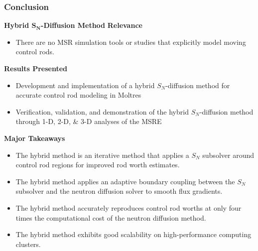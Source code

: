 \begin{frame}
  \frametitle{Conclusion}
  \begin{block}{\textbf{Hybrid $\bm{S_N}$-Diffusion Method}}
    \textbf{Relevance}
    \begin{itemize}
      \item There are no MSR simulation tools or studies that explicitly model moving control rods.
    \end{itemize}
    \textbf{Results Presented}
    \begin{itemize}
      \item Development and implementation of a hybrid $S_N$-diffusion method for
        accurate control rod modeling in Moltres
      \item Verification, validation, and demonstration of the hybrid $S_N$-diffusion
        method through 1-D, 2-D, \& 3-D analyses of the MSRE
    \end{itemize}
    \textbf{Major Takeaways}
    \begin{itemize}
      \item The hybrid method is an iterative method that applies a $S_N$ subsolver around control
        rod regions for improved rod worth estimates.
      \item The hybrid method applies an adaptive boundary coupling between
        the $S_N$ subsolver and the neutron diffusion solver to smooth flux gradients.
      \item The hybrid method accurately reproduces control rod worths at only four times the
        computational cost of the neutron diffusion method.
      \item The hybrid method exhibits good scalability on high-performance computing clusters.
    \end{itemize}
  \end{block}
\end{frame}
